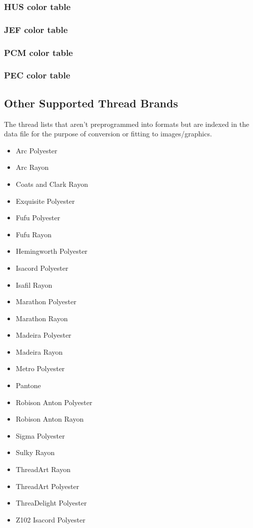 \documentclass[a4paper, 11pt]{report}
\begin{document}
\subsubsection{HUS color table}

\subsubsection{JEF color table}

\subsubsection{PCM color table}

\subsubsection{PEC color table}

\subsection{Other Supported Thread Brands}

The thread lists that aren't preprogrammed into formats but
are indexed in the data file for the purpose of conversion
or fitting to images/graphics.

\begin{itemize}
\item Arc Polyester
\item Arc Rayon
\item Coats and Clark Rayon
\item Exquisite Polyester
\item Fufu Polyester
\item Fufu Rayon
\item Hemingworth Polyester
\item Isacord Polyester
\item Isafil Rayon
\item Marathon Polyester
\item Marathon Rayon
\item Madeira Polyester
\item Madeira Rayon
\item Metro Polyester
\item Pantone
\item Robison Anton Polyester
\item Robison Anton Rayon
\item Sigma Polyester
\item Sulky Rayon
\item ThreadArt Rayon
\item ThreadArt Polyester
\item ThreaDelight Polyester
\item Z102 Isacord Polyester
\end{itemize}
\end{document}
